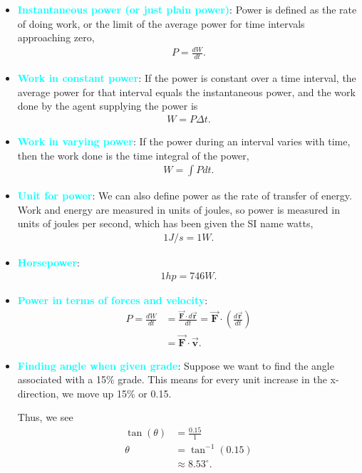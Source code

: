 \documentclass{report}
\begin{document}
\begin{itemize}
    \item \textbf{\textcolor{cyan}{Instantaneous power (or just plain power)}}: Power is defined as the rate of doing work, or the limit of the average power for time intervals approaching zero,
        \begin{align*}
            P = \frac{dW}{dt}
        .\end{align*}
    \item \textbf{\textcolor{cyan}{Work in constant power}}: If the power is constant over a time interval, the average power for that interval equals the instantaneous power, and the work done by the agent supplying the power is
        \begin{align*}
            W = P\Delta t
        .\end{align*}
    \item \textbf{\textcolor{cyan}{Work in varying power}}: If the power during an interval varies with time, then the work done is the time integral of the power,
        \begin{align*}
            W = \int Pdt
        .\end{align*}
    \item \textbf{\textcolor{cyan}{Unit for power}}:  We can also define power as the rate of transfer of energy. Work and energy are measured in units of joules, so power is measured in units of joules per second, which has been given the SI name watts,
        \begin{align*}
            1 J/s = 1 W
        .\end{align*}
    \item \textbf{\textcolor{cyan}{Horsepower}}:
        \begin{align*}
            1hp = 746 W
        .\end{align*}
    \item \textbf{\textcolor{cyan}{Power in terms of forces and velocity}}:
        \begin{align*}
            P = \frac{dW}{dt} &= \frac{\vec{\mathbf{F}} \cdot d\vec{\mathbf{r}}}{dt} = \vec{\mathbf{F}} \cdot \left(\frac{d\vec{\mathbf{r}}}{dt}\right) \\
            &=\vec{\mathbf{F}} \cdot \vec{\mathbf{v}}
        .\end{align*}
    \item \textbf{\textcolor{cyan}{Finding angle when given grade}}: Suppose we want to find the angle associated with a 15\% grade. This means for every unit increase in the x-direction, we move up 15\% or 0.15.
        \bigbreak \noindent 
\begin{figure}[ht]
    \centering
    \label{fig:grade}
\end{figure}
\bigbreak \noindent 
Thus, we see
\begin{align*}
    \tan{\left(\theta \right)} &= \frac{0.15}{1} \\
    \theta &=\tan^{-1}{\left(0.15\right)} \\
           &\approx 8.53^{\circ}
.\end{align*}
    \end{itemize}
\end{document}
